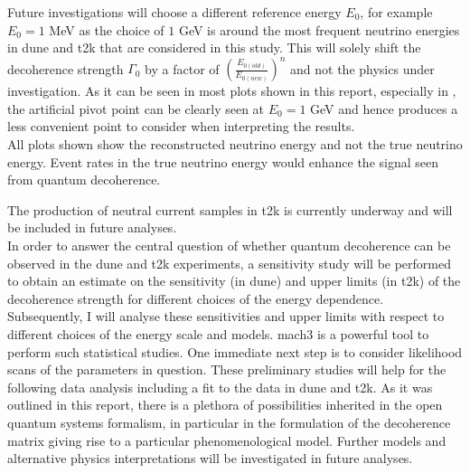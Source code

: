 Future investigations will choose a different reference energy $E_0$, for example $E_0 = 1$ MeV as the choice of $1$ GeV is around the most frequent neutrino energies in \acrshort{dune} and \acrshort{t2k} that are considered in this study. This will solely shift the decoherence strength $\Gamma_0$ by a factor of $\left(\frac{E_{0(old)}}{E_{0(new)}}\right)^n$ and not the physics under investigation. As it can be seen in most plots shown in this report, especially in , the artificial pivot point can be clearly seen at $E_0=1$ GeV and hence produces a less convenient point to consider when interpreting the results. \\

All plots shown show the reconstructed neutrino energy and not the true neutrino energy. Event rates in the true neutrino energy would enhance the signal seen from quantum decoherence.

The production of neutral current samples in \acrshort{t2k} is currently underway and will be included in future analyses. \\

In order to answer the central question of whether quantum decoherence can be observed in the \acrshort{dune} and \acrshort{t2k} experiments, a sensitivity study will be performed to obtain an estimate on the sensitivity (in \acrshort{dune}) and upper limits (in \acrshort{t2k}) of the decoherence strength for different choices of the energy dependence. Subsequently, I will analyse these sensitivities and upper limits with respect to different choices of the energy scale and models. \acrshort{mach3} is a powerful tool to perform such statistical studies. One immediate next step is to consider likelihood scans of the parameters in question. These preliminary studies will help for the following data analysis including a fit to the data in \acrshort{dune} and \acrshort{t2k}. As it was outlined in this report, there is a plethora of possibilities inherited in the open quantum systems formalism, in particular in the formulation of the decoherence matrix giving rise to a particular phenomenological model. Further models and alternative physics interpretations will be investigated in future analyses.